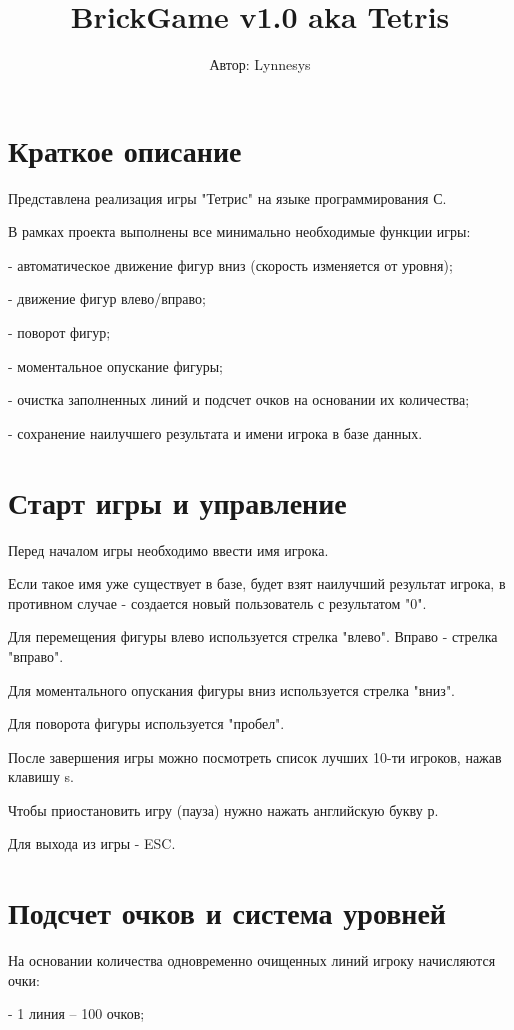 \documentclass{article}
\title{BrickGame v1.0 aka Tetris}
\author{Автор: Lynnesys}
\begin{document}
\maketitle

\section*{Краткое описание}
    Представлена реализация игры "Тетрис" на языке программирования С.

В рамках проекта выполнены все минимально необходимые функции игры:

    - автоматическое движение фигур вниз (скорость изменяется от уровня);

    - движение фигур влево/вправо;

    - поворот фигур;

    - моментальное опускание фигуры;

    - очистка заполненных линий и подсчет очков на основании их количества;

    - сохранение наилучшего результата и имени игрока в базе данных.


\section*{Старт игры и управление}
Перед началом игры необходимо ввести имя игрока.

Если такое имя уже существует в базе, будет взят наилучший результат игрока, в противном случае - создается новый пользователь с результатом "0".

Для перемещения фигуры влево используется стрелка "влево".
Вправо - стрелка "вправо".

Для моментального опускания фигуры вниз используется стрелка "вниз".

Для поворота фигуры используется "пробел".

После завершения игры можно посмотреть список лучших 10-ти игроков, нажав клавишу s.

Чтобы приостановить игру (пауза) нужно нажать английскую букву р.

Для выхода из игры - ESC.


\section*{Подсчет очков и система уровней}
На основании количества одновременно очищенных линий игроку начисляются очки:

- 1 линия -- 100 очков;
\end{document}
